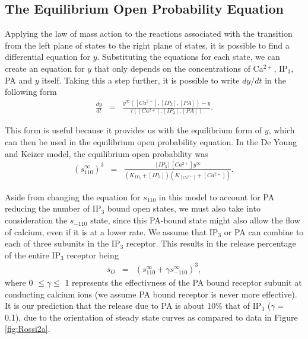 \documentclass[preprint,12pt]{elsarticle}
\begin{document}
\subsection{The Equilibrium Open Probability Equation}
\label{subsec:eq_open_prob}
Applying the law of mass action to the reactions associated with the transition from the left plane of states to the right plane of states, it is possible to find a differential equation for $y$. Substituting the equations for each state, we can create an equation for $y$ that only depends on the concentrations of Ca$^{2+}$, IP$_3$, PA and $y$ itself. Taking this a step further, it is possible to write $dy/dt$ in the following form
\begin{eqnarray}
	\frac{dy}{dt} &=& \frac{y^{\infty}([Ca^{2+}],[IP_3],[PA])-y}{\tau([Ca^{2+}],[IP_3],[PA])}.  \label{eqn:dydt}
\end{eqnarray}

This form is useful because it provides us with the equilibrium form of $y$, which can then be used in the equilibrium open probability equation. In the De Young and Keizer model, the equilibrium open probability was  
\begin{eqnarray}
	(s^{\infty}_{110})^3 &=& \frac{[IP_3][Ca^{2+}]y^{\infty}}{(K_{IP_3}+[IP_3])(K_{[Ca^{2+}]}+[Ca^{2+}])}. \nonumber \
\end{eqnarray}   

Aside from changing the equation for $s_{110}$ in this model to account for PA reducing the number of IP$_3$ bound open states, we must also take into consideration the $s_{-110}$ state, since this PA-bound state might also allow the flow of calcium, even if it is at a lower rate. We assume that IP$_3$ or PA can combine to each of three subunits in the IP$_3$ receptor. This results in the release percentage of the entire IP$_3$ receptor being
\begin{eqnarray}
    s_O &=& (s^{\infty}_{110}+\gamma s^{\infty}_{-110})^3,  \label{eqn:sO} 	
\end{eqnarray}   
where 0 $\leq \gamma \leq$ 1 represents the effectivness of the PA bound receptor subunit at conducting calcium ions (we assume PA bound receptor is never more effective). It is our prediction that the release due to PA is about 10\% that of IP$_3$ ($\gamma =$ 0.1), due to the orientation of steady state curves as compared to data in Figure \ref{fig:Rossi2a}.
\end{document}
